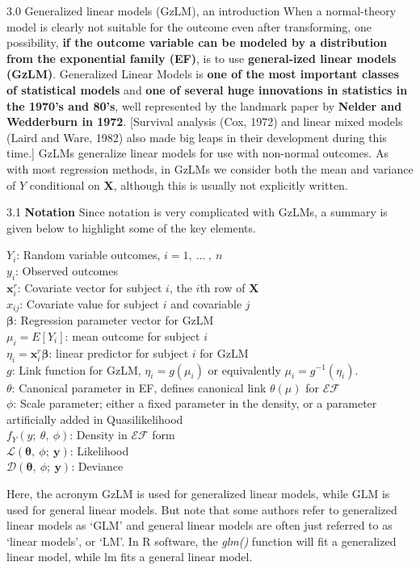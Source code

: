 \documentclass[
  9pt,
  ignorenonframetext,
]{beamer}
\begin{document}
\begin{frame}{3.0 Generalized linear models (GzLM), an introduction}
\protect\hypertarget{generalized-linear-models-gzlm-an-introduction-1}{}
When a normal-theory model is clearly not suitable for the outcome even
after transforming, one possibility, \textbf{if the outcome variable can
be modeled by a distribution from the exponential family (EF)}, is to
use \textbf{general-ized linear models (GzLM)}. Generalized Linear
Models is \textbf{one of the most important classes of statistical
models} and \textbf{one of several huge innovations in statistics in the
1970's and 80's}, well represented by the landmark paper by
\textbf{Nelder and Wedderburn in 1972}. {[}Survival analysis (Cox, 1972)
and linear mixed models (Laird and Ware, 1982) also made big leaps in
their development during this time.{]} GzLMs generalize linear models
for use with non-normal outcomes. As with most regression methods, in
GzLMs we consider both the mean and variance of \(Y\) conditional on
\(\pmb X\), although this is usually not explicitly written.
\end{frame}

\begin{frame}{3.1 \textbf{Notation}}
\protect\hypertarget{notation}{}
Since notation is very complicated with GzLMs, a summary is given below
to highlight some of the key elements.

\(Y_i\): Random variable outcomes, \(i=1,\ ...\ ,\ n\)\\
\(y_i\): Observed outcomes\\
\(\pmb x_i^r\): Covariate vector for subject \(i\), the \(i\)th row of
\(\pmb X\)\\
\(x_{ij}\): Covariate value for subject \(i\) and covariable \(j\)\\
\(\pmb \beta\): Regression parameter vector for GzLM\\
\alert {$\mu_i =E[Y_i]$: mean outcome for subject $i$}\\
\(\eta_i =\pmb x_i^r \pmb \beta\): linear predictor for subject \(i\)
for GzLM\\
\(g\): Link function for GzLM, \(\eta_i=g(\mu_i)\) or equivalently
\(\mu_i=g^{-1}(\eta_i)\).\\
\(\theta\): Canonical parameter in EF, defines canonical link
\(\theta(\mu)\) for \(\mathcal {EF}\)\\
\(\phi\): Scale parameter; either a fixed parameter in the density, or a
parameter artificially added in Quasilikelihood\\
\(f_Y (y;\ \theta,\ \phi)\): Density in \(\mathcal {EF}\) form\\
\(\mathcal L(\pmb \theta,\ \phi;\ \pmb y)\): Likelihood\\
\(\mathcal D(\pmb \theta,\ \phi;\ \pmb y)\): Deviance

Here, the acronym GzLM is used for generalized linear models, while GLM
is used for general linear models. But note that some authors refer to
generalized linear models as `GLM' and general linear models are often
just referred to as `linear models', or `LM'. In R software, the
\emph{glm()} function will fit a generalized linear model, while lm fits
a general linear model.
\end{frame}
\end{document}
